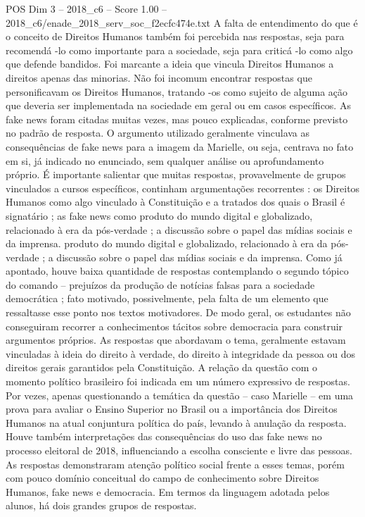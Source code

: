 \begin{textsample}{POS Dim 3 – 2018\_c6 – Score 1.00 – 2018\_c6/enade\_2018\_serv\_soc\_f2ecfc474e.txt}
A falta de entendimento do que é o conceito de Direitos Humanos também foi percebida nas respostas, seja para recomendá -lo como importante para a sociedade, seja para criticá -lo como algo que defende bandidos.
Foi marcante a ideia que vincula Direitos Humanos a direitos apenas das minorias.
Não foi incomum encontrar respostas que personificavam os Direitos Humanos, tratando -os como sujeito de alguma ação que deveria ser implementada na sociedade em geral ou em casos específicos.
As fake news foram citadas muitas vezes, mas pouco explicadas, conforme previsto no padrão de resposta.
O argumento utilizado geralmente vinculava as consequências de fake news para a imagem da Marielle, ou seja, centrava no fato em si, já indicado no enunciado, sem qualquer análise ou aprofundamento próprio.
É importante salientar que muitas respostas, provavelmente de grupos vinculados a cursos específicos, continham argumentações recorrentes : os Direitos Humanos como algo vinculado à Constituição e a tratados dos quais o Brasil é signatário ; as fake news como produto do mundo digital e globalizado, relacionado à era da pós-verdade ; a discussão sobre o papel das mídias sociais e da imprensa. produto do mundo digital e globalizado, relacionado à era da pós-verdade ; a discussão sobre o papel das mídias sociais e da imprensa.
Como já apontado, houve baixa quantidade de respostas contemplando o segundo tópico do comando – prejuízos da produção de notícias falsas para a sociedade democrática ; fato motivado, possivelmente, pela falta de um elemento que ressaltasse esse ponto nos textos motivadores.
De modo geral, os estudantes não conseguiram recorrer a conhecimentos tácitos sobre democracia para construir argumentos próprios.
As respostas que abordavam o tema, geralmente estavam vinculadas à ideia do direito à verdade, do direito à integridade da pessoa ou dos direitos gerais garantidos pela Constituição.
A relação da questão com o momento político brasileiro foi indicada em um número expressivo de respostas.
Por vezes, apenas questionando a temática da questão – caso Marielle – em uma prova para avaliar o Ensino Superior no Brasil ou a importância dos Direitos Humanos na atual conjuntura política do país, levando à anulação da resposta.
Houve também interpretações das consequências do uso das fake news no processo eleitoral de 2018, influenciando a escolha consciente e livre das pessoas.
As respostas demonstraram atenção político social frente a esses temas, porém com pouco domínio conceitual do campo de conhecimento sobre Direitos Humanos, fake news e democracia.
Em termos da linguagem adotada pelos alunos, há dois grandes grupos de respostas.

\end{textsample}
